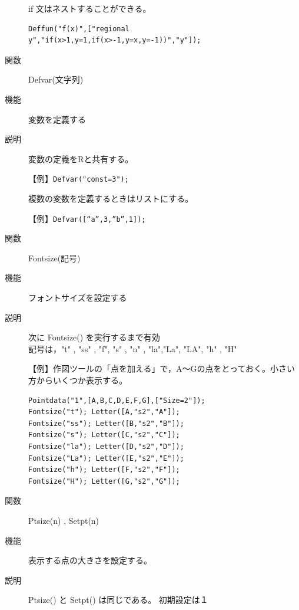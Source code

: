 \documentclass[papersize,a4paper,12pt,uplatex]{jsarticle}
\begin{document}
\begin{description}
\vspace{\baselineskip}
\hspace{20mm}\scalebox{0.9}{}

if 文はネストすることができる。
\begin{verbatim}
Deffun("f(x)",["regional y","if(x>1,y=1,if(x>-1,y=x,y=-1))","y"]);
\end{verbatim}

\vspace{\baselineskip}
\hspace{20mm}\scalebox{0.9}{}


\vspace{\baselineskip}
\hypertarget{defvar}{}
\item[関数]Defvar(文字列)
\item[機能]変数を定義する
\item[説明]変数の定義をRと共有する。

【例】\verb|Defvar("const=3");|

\vspace{\baselineskip}
複数の変数を定義するときはリストにする。

【例】\verb|Defvar([“a”,3,”b”,1]);|

\vspace{\baselineskip}
\hypertarget{fontsize}{}
\item[関数]Fontsize(記号)
\item[機能]フォントサイズを設定する
\item[説明]次に Fontsize() を実行するまで有効\\
記号は，"t" , "ss" , "f", "s" , "n" , "la","La", "LA", "h" , "H"

【例】作図ツールの「点を加える」で，A〜Gの点をとっておく。小さい方からいくつか表示する。
\begin{verbatim}
Pointdata("1",[A,B,C,D,E,F,G],["Size=2"]);
Fontsize("t"); Letter([A,"s2","A"]);
Fontsize("ss"); Letter([B,"s2","B"]);
Fontsize("s"); Letter([C,"s2","C"]);
Fontsize("la"); Letter([D,"s2","D"]);
Fontsize("La"); Letter([E,"s2","E"]);
Fontsize("h"); Letter([F,"s2","F"]);
Fontsize("H"); Letter([G,"s2","G"]);
\end{verbatim}


\vspace{\baselineskip}
\hypertarget{setpt}{}
\hypertarget{ptsize}{}
\item[関数]Ptsize(n) , Setpt(n)
\item[機能]表示する点の大きさを設定する。
\item[説明]Ptsize() と Setpt() は同じである。 初期設定は１


\end{description}
\end{document}
